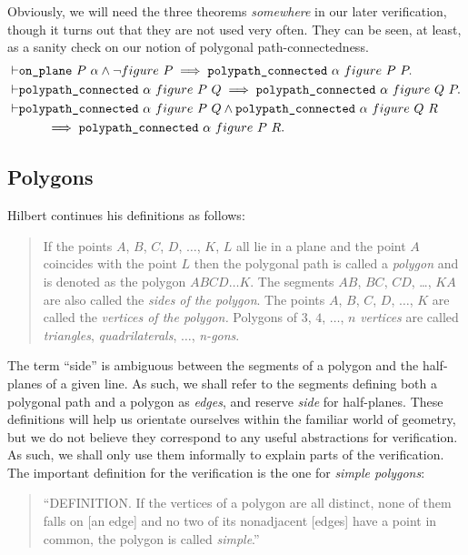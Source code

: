 Obviously, we will need the three theorems \emph{somewhere} in our later verification, though it turns out that they are not used very often. They can be seen, at least, as a sanity check on our notion of polygonal path-connectedness.
\begin{align*}
  \vdash&\texttt{on\_plane}\ P\ \alpha \wedge \neg figure\ P \implies \texttt{polypath\_connected}\ \alpha\ figure\ P\ P.\\
  \vdash&\texttt{polypath\_connected}\ \alpha\ figure\ P\ Q \implies \texttt{polypath\_connected}\ \alpha\ figure\ Q\ P.\\
  \vdash&\texttt{polypath\_connected}\ \alpha\ figure\ P\ Q \wedge \texttt{polypath\_connected}\ \alpha\ figure\ Q\ R\\
  &\qquad\implies \texttt{polypath\_connected}\ \alpha\ figure\ P\ R.
\end{align*}

\subsection{Polygons}\label{sec:polygonFormalisation}
Hilbert continues his definitions as follows:
\begin{quotation}
  If the points $A$, $B$, $C$, $D$, $\ldots$, $K$, $L$ all lie in a plane and the point $A$ coincides with the point $L$ then the polygonal path is called a \emph{polygon} and is denoted as the polygon $ABCD\ldots K$. The segments $AB$, $BC$, $CD$, \ldots, $KA$ are also called the \emph{sides of the polygon}. The points $A$, $B$, $C$, $D$, $\ldots$, $K$ are called the \emph{vertices of the polygon.} Polygons of $3$, $4$, $\ldots$, $n$ \emph{vertices} are called \emph{triangles}, \emph{quadrilaterals}, $\ldots$, \emph{n-gons}.
\end{quotation}

The term ``side'' is ambiguous between the segments of a polygon and the half-planes of a given line. As such, we shall refer to the segments defining both a polygonal path and a polygon as \emph{edges}, and reserve \emph{side} for half-planes. These definitions will help us orientate ourselves within the familiar world of geometry, but we do not believe they correspond to any useful abstractions for verification. As such, we shall only use them informally to explain parts of the verification. The important definition for the verification is the one for \emph{simple polygons}:
\begin{quote}
  ``DEFINITION. If the vertices of a polygon are all distinct, none of them falls on [an edge] and no two of its nonadjacent [edges] have a point in common, the polygon is called \emph{simple}.''
\end{quote}

